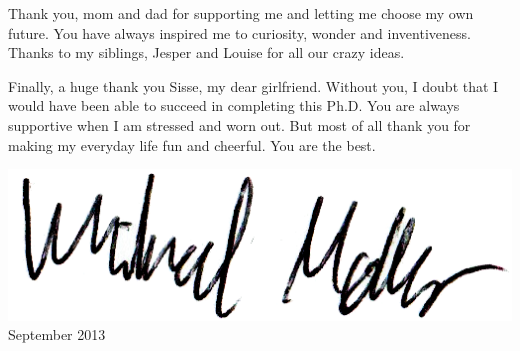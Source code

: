 Thank you, mom and dad for supporting me and letting me choose my own future. You have always inspired me to curiosity, wonder and inventiveness. Thanks to my siblings, Jesper and Louise for all our crazy ideas.

Finally, a huge thank you Sisse, my dear girlfriend. Without you, I doubt that I would have been able to succeed in completing this Ph.D. You are always supportive when I am stressed and worn out. But most of all thank you for making my everyday life fun and cheerful. You are the best.
\vspace{1mm}
\begin{flushright}
\includegraphics[scale=0.2]{formalstuff/signatur.png}\\
September 2013
\end{flushright}


